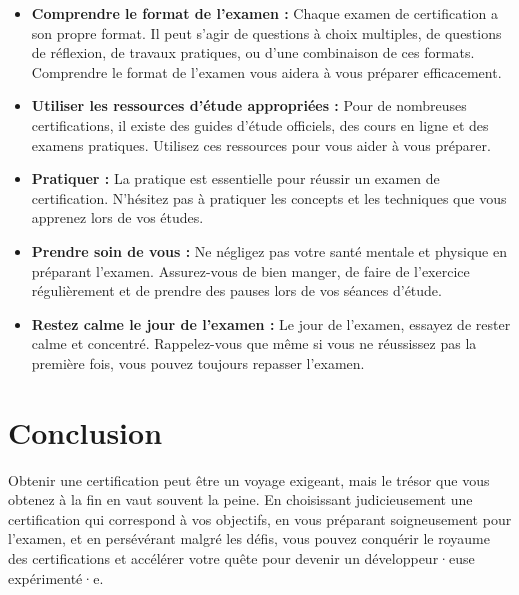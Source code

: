 \begin{itemize}
    \item \textbf{Comprendre le format de l'examen :} Chaque examen de certification a son propre format. Il peut s'agir de questions à choix multiples, de questions de réflexion, de travaux pratiques, ou d'une combinaison de ces formats. Comprendre le format de l'examen vous aidera à vous préparer efficacement.
    \item \textbf{Utiliser les ressources d'étude appropriées :} Pour de nombreuses certifications, il existe des guides d'étude officiels, des cours en ligne et des examens pratiques. Utilisez ces ressources pour vous aider à vous préparer.
    \item \textbf{Pratiquer :} La pratique est essentielle pour réussir un examen de certification. N'hésitez pas à pratiquer les concepts et les techniques que vous apprenez lors de vos études.
    \item \textbf{Prendre soin de vous :} Ne négligez pas votre santé mentale et physique en préparant l'examen. Assurez-vous de bien manger, de faire de l'exercice régulièrement et de prendre des pauses lors de vos séances d'étude.
    \item \textbf{Restez calme le jour de l'examen :} Le jour de l'examen, essayez de rester calme et concentré. Rappelez-vous que même si vous ne réussissez pas la première fois, vous pouvez toujours repasser l'examen.
\end{itemize}

\section{Conclusion}

Obtenir une certification peut être un voyage exigeant, mais le trésor que vous obtenez à la fin en vaut souvent la peine. En choisissant judicieusement une certification qui correspond à vos objectifs, en vous préparant soigneusement pour l'examen, et en persévérant malgré les défis, vous pouvez conquérir le royaume des certifications et accélérer votre quête pour devenir un développeur·euse expérimenté·e.